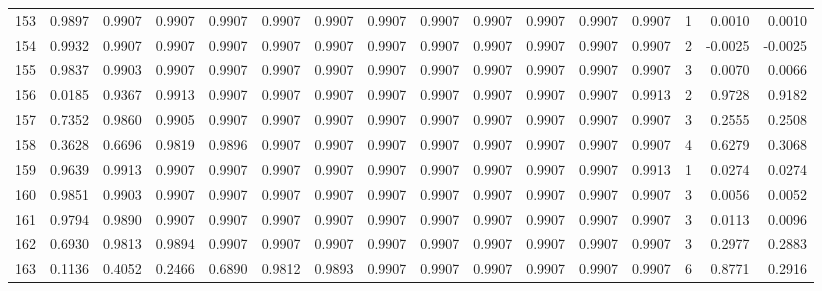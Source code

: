 \begin{tabular}{lrrrrrrrrrrrrrrr}
153 &      0.9897 &  0.9907 &  0.9907 &  0.9907 &  0.9907 &  0.9907 &  0.9907 &  0.9907 &  0.9907 &  0.9907 &   0.9907 &     0.9907 &      1 &                    0.0010 &                     0.0010 \\
154 &      0.9932 &  0.9907 &  0.9907 &  0.9907 &  0.9907 &  0.9907 &  0.9907 &  0.9907 &  0.9907 &  0.9907 &   0.9907 &     0.9907 &      2 &                   -0.0025 &                    -0.0025 \\
155 &      0.9837 &  0.9903 &  0.9907 &  0.9907 &  0.9907 &  0.9907 &  0.9907 &  0.9907 &  0.9907 &  0.9907 &   0.9907 &     0.9907 &      3 &                    0.0070 &                     0.0066 \\
156 &      0.0185 &  0.9367 &  0.9913 &  0.9907 &  0.9907 &  0.9907 &  0.9907 &  0.9907 &  0.9907 &  0.9907 &   0.9907 &     0.9913 &      2 &                    0.9728 &                     0.9182 \\
157 &      0.7352 &  0.9860 &  0.9905 &  0.9907 &  0.9907 &  0.9907 &  0.9907 &  0.9907 &  0.9907 &  0.9907 &   0.9907 &     0.9907 &      3 &                    0.2555 &                     0.2508 \\
158 &      0.3628 &  0.6696 &  0.9819 &  0.9896 &  0.9907 &  0.9907 &  0.9907 &  0.9907 &  0.9907 &  0.9907 &   0.9907 &     0.9907 &      4 &                    0.6279 &                     0.3068 \\
159 &      0.9639 &  0.9913 &  0.9907 &  0.9907 &  0.9907 &  0.9907 &  0.9907 &  0.9907 &  0.9907 &  0.9907 &   0.9907 &     0.9913 &      1 &                    0.0274 &                     0.0274 \\
160 &      0.9851 &  0.9903 &  0.9907 &  0.9907 &  0.9907 &  0.9907 &  0.9907 &  0.9907 &  0.9907 &  0.9907 &   0.9907 &     0.9907 &      3 &                    0.0056 &                     0.0052 \\
161 &      0.9794 &  0.9890 &  0.9907 &  0.9907 &  0.9907 &  0.9907 &  0.9907 &  0.9907 &  0.9907 &  0.9907 &   0.9907 &     0.9907 &      3 &                    0.0113 &                     0.0096 \\
162 &      0.6930 &  0.9813 &  0.9894 &  0.9907 &  0.9907 &  0.9907 &  0.9907 &  0.9907 &  0.9907 &  0.9907 &   0.9907 &     0.9907 &      3 &                    0.2977 &                     0.2883 \\
163 &      0.1136 &  0.4052 &  0.2466 &  0.6890 &  0.9812 &  0.9893 &  0.9907 &  0.9907 &  0.9907 &  0.9907 &   0.9907 &     0.9907 &      6 &                    0.8771 &                     0.2916 \\

\end{tabular}
